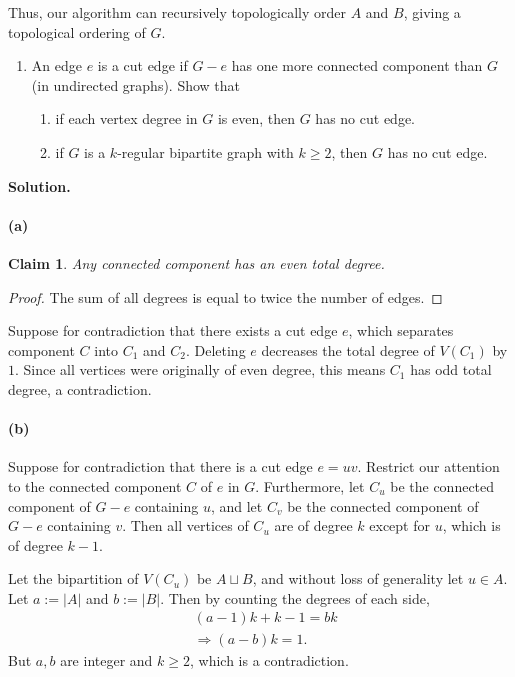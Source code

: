 \documentclass[11pt,letterpaper]{article}
\newtheorem{claim}[theorem]{Claim}
\theoremstyle{definition}
\newcommand{\solution}{\medskip\noindent\textbf{Solution.}\par\medskip}
\begin{document}
Thus, our algorithm can recursively topologically order $A$ and $B$, giving a topological ordering of $G$.


\begin{enumerate}[resume=q]
\item[7.*] An edge $e$ is a cut edge if $G - e$ has one more connected component than $G$ (in undirected graphs). Show that
\begin{enumerate}
\item if each vertex degree in $G$ is even, then $G$ has no cut edge.
\item if $G$ is a $k$-regular bipartite graph with $k \geq 2$, then $G$ has no cut edge.
\end{enumerate}
\end{enumerate}

\solution
\paragraph{(a)}
\begin{claim}
    Any connected component has an even total degree.
\end{claim}
\begin{proof}
    The sum of all degrees is equal to twice the number of edges.
\end{proof}
Suppose for contradiction that there exists a cut edge $e$, which separates component $C$ into $C_1$ and $C_2$.
Deleting $e$ decreases the total degree of $V(C_1)$ by $1$. Since all vertices were originally of even degree, this means $C_1$ has odd total degree, a contradiction.

\paragraph{(b)}
Suppose for contradiction that there is a cut edge $e= uv$. 
Restrict our attention to the connected component $C$ of $e$ in $G$.
Furthermore, let $C_u$ be the connected component of $G-e$ containing $u$, and let $C_v$ be the connected component of $G-e$ containing $v$.
Then all vertices of $C_u$ are of degree $k$ except for $u$, which is of degree $k-1$.

Let the bipartition of $V(C_u)$ be $A\sqcup B$, and without loss of generality let $u\in A$.
Let $a:=|A|$ and $b:=|B|$. 
Then by counting the degrees of each side,
\begin{align*}
    &(a-1)k + k-1 = bk \\
    &\Rightarrow (a-b)k = 1.
\end{align*}
But $a,b$ are integer and $k\geq 2$, which is a contradiction.
\end{document}
